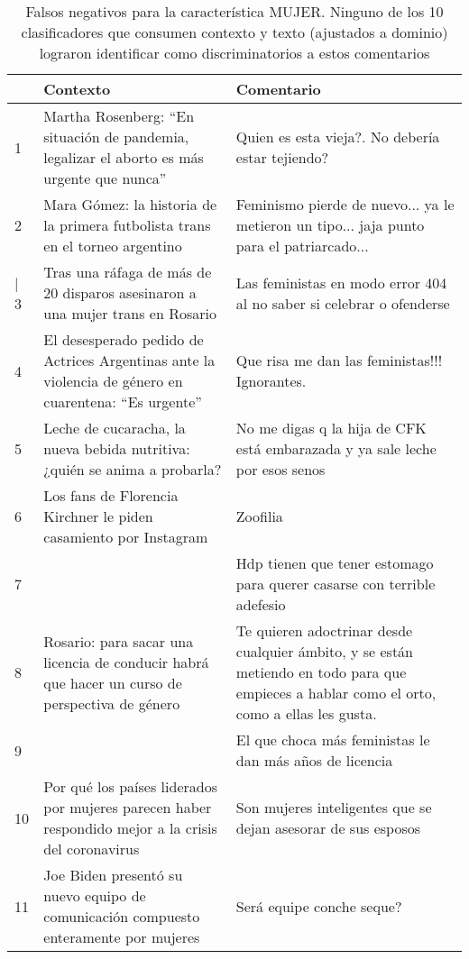 \begin{table}[t]
    \centering
    \small
    \begin{tabular}{p{} p{} p{}}
        & Contexto & Comentario \\
        \hline
        1 & Martha Rosenberg: ``En situación de pandemia, legalizar el aborto es más urgente que nunca'' & Quien es esta vieja?. No debería estar tejiendo? \\
        \hline
        2& Mara Gómez: la historia de la primera futbolista trans en el torneo argentino  &  Feminismo pierde de nuevo... ya le metieron un tipo... jaja punto para el patriarcado...	 \\
        \hline|
        3& Tras una ráfaga de más de 20 disparos asesinaron a una mujer trans en Rosario & Las feministas en modo error 404 al no saber si celebrar o ofenderse  \\
        \hline
        4& El desesperado pedido de Actrices Argentinas ante la violencia de género en cuarentena: ``Es urgente'' & Que risa me dan las feministas!!! Ignorantes.	 \\
        \hline
        5& Leche de cucaracha, la nueva bebida nutritiva: ¿quién se anima a probarla? & No me digas q la hija de CFK está embarazada y ya sale leche por esos senos	 \\
        \hline
        6& Los fans de Florencia Kirchner le piden casamiento por Instagram & Zoofilia \\
        7&                       & Hdp tienen que tener estomago para querer casarse con terrible adefesio \\
        \hline
        8& Rosario: para sacar una licencia de conducir habrá que hacer un curso de perspectiva de género & Te quieren adoctrinar desde cualquier ámbito, y se están metiendo en todo para que empieces a hablar como el orto, como a ellas les gusta.	\\
        9&   & El que choca más feministas le dan más años de licencia	\\
        \hline
        10& Por qué los países liderados por mujeres parecen haber respondido mejor a la crisis del coronavirus & Son mujeres inteligentes que se dejan asesorar de sus esposos \\
        11& Joe Biden presentó su nuevo equipo de comunicación compuesto enteramente por mujeres & Será equipe conche seque?	\\
         \hline
    \end{tabular}
    \caption{Falsos negativos para la característica MUJER. Ninguno de los 10 clasificadores que consumen contexto y texto (ajustados a dominio) lograron identificar como discriminatorios a estos comentarios }
    \label{tab:women_error_analysis}
\end{table}




